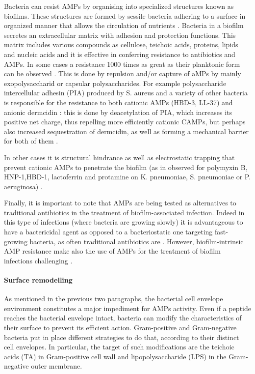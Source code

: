 Bacteria can resist AMPs by organising into specialized structures known as biofilms. These structures are formed by sessile bacteria adhering to a surface in organized manner that allows the circulation of nutrients \cite{Costerton1999}.
Bacteria in a biofilm secretes an extracellular matrix with adhesion and protection functions. This matrix includes various compounds as cellulose, teichoic acids, proteins, lipids and nucleic acids \cite{Jolivet-Gougeon2014}
and it is effective in conferring resistance to antibiotics and AMPs. In some cases a resistance 1000 times as great as their planktonic form can be observed \cite{Nickel1985,Mah2001}.
This is done by repulsion and/or capture of aMPs by mainly exopolysaccharid or capsular polysaccharides.
%
For example polysaccharide intercellular adhesin (PIA) produced by S. aureus and a variety of other bacteria is responsible for the resistance to both cationic AMPs (HBD-3, LL-37) and anionic dermcidin \cite{Wang2004,Vuong2004PIA}:
this is done by deacetylation of PIA, which increases its positive net charge, thus repelling more efficiently cationic CAMPs, but perhaps also increased sequestration of dermcidin, as well as forming a mechanical barrier for both of them \cite{Vuong2004}.

In other cases it is structural hindrance as well as electrostatic trapping that prevent cationic AMPs to penetrate the biofilm (as in observed for polymyxin B, HNP-1,HBD-1, lactoferrin and protamine on K. pneumoniae, S. pneumoniae or P. aeruginosa) \cite{Campos2004,Llobet2008}.

Finally, it is important to note that AMPs are being tested as alternatives to traditional antibiotics in the treatment of biofilm-associated infection. Indeed in this type of infections (where bacteria are growing slowly) it is advantageous to have a bactericidal agent as opposed to a bacteriostatic one targeting fast-growing bacteria, as often traditional antibiotics are \cite{Batoni2011,Strempel2014}.
However, biofilm-intrinsic AMP resistance make also the use of AMPs for the treatment of biofilm infections challenging \cite{Joo2012,DiLuca2014}.

\paragraph{Surface remodelling}
As mentioned in the previous two paragraphs, the bacterial cell envelope environment constitutes a major impediment for AMPs activity.
%
Even if a peptide reaches the bacterial envelope intact, bacteria can modify the characteristics of their surface to prevent its efficient action.
%
Gram-positive and Gram-negative bacteria put in place different strategies to do that, according to their distinct cell envelopes.
%
In particular, the target of such modifications are the teichoic acids (TA) in Gram-positive cell wall and lipopolysaccharide (LPS) in the Gram-negative outer membrane.

